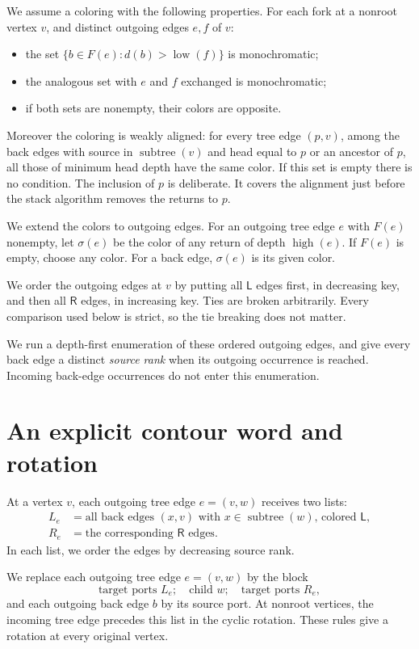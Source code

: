 \documentclass[11pt]{article}
\DeclareMathOperator{\low}{low}
\DeclareMathOperator{\high}{high}
\DeclareMathOperator{\subtree}{subtree}
\newcommand{\cL}{\mathsf{L}}
\newcommand{\cR}{\mathsf{R}}
\begin{document}
We assume a coloring with the following properties. For each fork at a nonroot
vertex $v$, and distinct outgoing edges $e,f$ of $v$:
\begin{itemize}[nosep]
\item the set $\{b\in F(e):d(b)>\low(f)\}$ is monochromatic;
\item the analogous set with $e$ and $f$ exchanged is monochromatic;
\item if both sets are nonempty, their colors are opposite.
\end{itemize}
Moreover the coloring is weakly aligned: for every tree edge $(p,v)$, among the
back edges with source in $\subtree(v)$ and head equal to $p$ or an ancestor of
$p$, all those of minimum head depth have the same color. If this set is empty
there is no condition. The inclusion of $p$ is deliberate. It covers the
alignment just before the stack algorithm removes the returns to $p$.

We extend the colors to outgoing edges. For an outgoing tree edge $e$ with
$F(e)$ nonempty, let $\sigma(e)$ be the color of any return of depth $\high(e)$.
If $F(e)$ is empty, choose any color. For a back edge, $\sigma(e)$ is its given
color.

We order the outgoing edges at $v$ by putting all $\cL$ edges first, in
decreasing key, and then all $\cR$ edges, in increasing key. Ties are broken
arbitrarily. Every comparison used below is strict, so the tie breaking does
not matter.

We run a depth-first enumeration of these ordered outgoing edges, and give
every back edge a distinct \emph{source rank} when its outgoing occurrence is
reached. Incoming back-edge occurrences do not enter this enumeration.

\section{An explicit contour word and rotation}

At a vertex $v$, each outgoing tree edge $e=(v,w)$ receives two lists:
\begin{align*}
L_e&=\text{all back edges $(x,v)$ with $x\in\subtree(w)$, colored $\cL$},\\
R_e&=\text{the corresponding $\cR$ edges}.
\end{align*}
In each list, we order the edges by decreasing source rank.

We replace each outgoing tree edge $e=(v,w)$ by the block
\begin{equation*}
\text{target ports }L_e;\quad\text{child }w;\quad\text{target ports }R_e,
\end{equation*}
and each outgoing back edge $b$ by its source port. At nonroot vertices, the
incoming tree edge precedes this list in the cyclic rotation. These rules give
a rotation at every original vertex.
\end{document}
